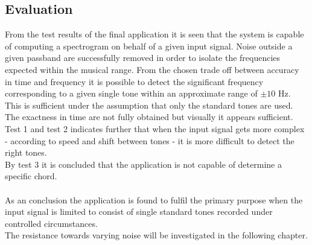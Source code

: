 \subsection{Evaluation}
From the test results of the final application it is seen that the system is capable of computing a spectrogram on behalf of a given input signal. Noise outside a given passband are successfully removed in order to isolate the frequencies expected within the musical range. From the chosen trade off between accuracy in time and frequency   it is possible to detect the significant frequency corresponding to a given single tone within an approximate range of $\pm 10$ Hz. This is sufficient under the assumption that only the standard tones are used. The exactness in time are not fully obtained but visually it appears sufficient.\\        
Test 1 and test 2 indicates further that when the input signal gets more complex - according to speed and shift between tones - it is more difficult to detect the right tones. \\
By test 3 it is concluded that the application is not capable of determine a specific chord.\\   
\\
As an conclusion the application is found to fulfil the primary purpose when the input signal is limited to consist of single standard tones recorded under controlled circumstances.\\
The resistance towards varying noise will be investigated in the following chapter.           